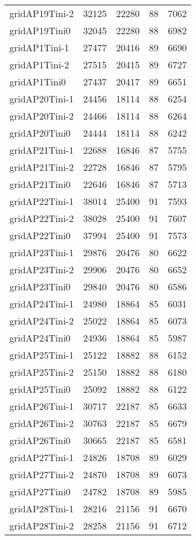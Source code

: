 \begin{longtable}{lrrrr}
gridAP19Tini-2 & 32125 & 22280 & 88 & 7062 \\
gridAP19Tini0 & 32045 & 22280 & 88 & 6982 \\
gridAP1Tini-1 & 27477 & 20416 & 89 & 6690 \\
gridAP1Tini-2 & 27515 & 20415 & 89 & 6727 \\
gridAP1Tini0 & 27437 & 20417 & 89 & 6651 \\
gridAP20Tini-1 & 24456 & 18114 & 88 & 6254 \\
gridAP20Tini-2 & 24466 & 18114 & 88 & 6264 \\
gridAP20Tini0 & 24444 & 18114 & 88 & 6242 \\
gridAP21Tini-1 & 22688 & 16846 & 87 & 5755 \\
gridAP21Tini-2 & 22728 & 16846 & 87 & 5795 \\
gridAP21Tini0 & 22646 & 16846 & 87 & 5713 \\
gridAP22Tini-1 & 38014 & 25400 & 91 & 7593 \\
gridAP22Tini-2 & 38028 & 25400 & 91 & 7607 \\
gridAP22Tini0 & 37994 & 25400 & 91 & 7573 \\
gridAP23Tini-1 & 29876 & 20476 & 80 & 6622 \\
gridAP23Tini-2 & 29906 & 20476 & 80 & 6652 \\
gridAP23Tini0 & 29840 & 20476 & 80 & 6586 \\
gridAP24Tini-1 & 24980 & 18864 & 85 & 6031 \\
gridAP24Tini-2 & 25022 & 18864 & 85 & 6073 \\
gridAP24Tini0 & 24936 & 18864 & 85 & 5987 \\
gridAP25Tini-1 & 25122 & 18882 & 88 & 6152 \\
gridAP25Tini-2 & 25150 & 18882 & 88 & 6180 \\
gridAP25Tini0 & 25092 & 18882 & 88 & 6122 \\
gridAP26Tini-1 & 30717 & 22187 & 85 & 6633 \\
gridAP26Tini-2 & 30763 & 22187 & 85 & 6679 \\
gridAP26Tini0 & 30665 & 22187 & 85 & 6581 \\
gridAP27Tini-1 & 24826 & 18708 & 89 & 6029 \\
gridAP27Tini-2 & 24870 & 18708 & 89 & 6073 \\
gridAP27Tini0 & 24782 & 18708 & 89 & 5985 \\
gridAP28Tini-1 & 28216 & 21156 & 91 & 6670 \\
gridAP28Tini-2 & 28258 & 21156 & 91 & 6712 \\

\end{longtable}
